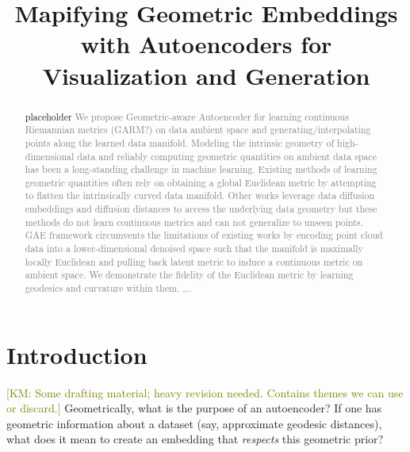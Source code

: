 \documentclass{article}
\title{Mapifying Geometric Embeddings with Autoencoders for Visualization and Generation}
\author{
}
\theoremstyle{plain}
\theoremstyle{definition}
\theoremstyle{remark}
\newcommand{\km}[1]{\textcolor{olive}{[KM: #1]}}
\begin{document}



\maketitle


\begin{abstract}
placeholder
\textcolor{gray}{We propose Geometric-aware Autoencoder for learning continuous Riemannian metrics (GARM?) on data ambient space and generating/interpolating points along the learned data manifold.  Modeling the intrinsic geometry of high-dimensional data and reliably computing geometric quantities on ambient data space has been a long-standing challenge in machine learning. Existing methods of learning geometric quantities often rely on obtaining a global Euclidean metric by attempting to flatten the intrinsically curved data manifold. Other works leverage data diffusion embeddings and diffusion distances to access the underlying data geometry but these methods do not learn continuous metrics and can not generalize to unseen points. GAE framework circumvents the limitations of existing works by encoding point cloud data into a lower-dimensional denoised space such that the manifold is maximally locally Euclidean and pulling back latent metric to induce a continuous metric on ambient space. We demonstrate the fidelity of the Euclidean metric by learning geodesics and curvature within them.  …. }
\end{abstract}

\section{Introduction}









\km{Some drafting material; heavy revision needed. Contains themes we can use or discard.}
Geometrically, what is the purpose of an autoencoder? If one has geometric information about a dataset (say, approximate geodesic distances), what does it mean to create an embedding that \emph{respects} this geometric prior?
\end{document}
